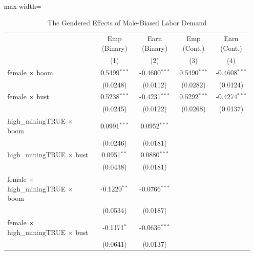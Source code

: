 
\begin{table}[htbp]
   \caption{\label{tab:main} The Gendered Effects of Male-Biased Labor Demand}
   \bigskip
   \centering
   \begin{adjustbox}{max width=\textwidth}
   \begin{tabular}{lcccc}
      \toprule
                                                        & Emp (Binary)   & Earn (Binary)   & Emp (Cont.)     & Earn (Cont.) \\   
                                                        & (1)            & (2)             & (3)             & (4)\\  
      \midrule 
      female $\times$ boom                              & 0.5499$^{***}$ & -0.4600$^{***}$ & 0.5490$^{***}$  & -0.4608$^{***}$\\   
                                                        & (0.0248)       & (0.0112)        & (0.0282)        & (0.0124)\\   
      female $\times$ bust                              & 0.5238$^{***}$ & -0.4231$^{***}$ & 0.5292$^{***}$  & -0.4274$^{***}$\\   
                                                        & (0.0245)       & (0.0122)        & (0.0268)        & (0.0137)\\   
      high\_miningTRUE $\times$ boom                    & 0.0991$^{***}$ & 0.0952$^{***}$  &                 &   \\   
                                                        & (0.0246)       & (0.0181)        &                 &   \\   
      high\_miningTRUE $\times$ bust                    & 0.0951$^{**}$  & 0.0880$^{***}$  &                 &   \\   
                                                        & (0.0438)       & (0.0181)        &                 &   \\   
      female $\times$ high\_miningTRUE $\times$ boom    & -0.1220$^{**}$ & -0.0766$^{***}$ &                 &   \\   
                                                        & (0.0534)       & (0.0187)        &                 &   \\   
      female $\times$ high\_miningTRUE $\times$ bust    & -0.1171$^{*}$  & -0.0636$^{***}$ &                 &   \\   
                                                        & (0.0641)       & (0.0137)        &                 &   \\   

\end{tabular}
\end{adjustbox}
\end{table}
